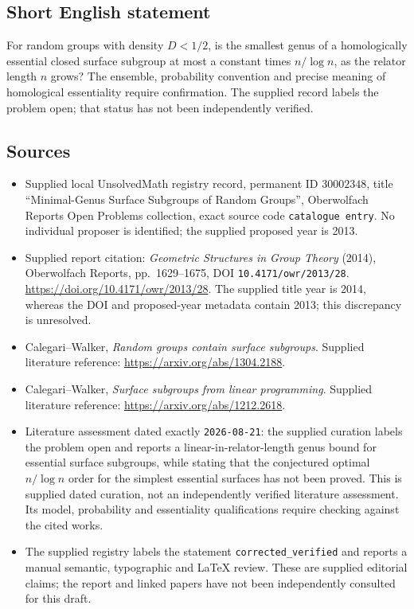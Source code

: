 \documentclass[11pt]{article}
\begin{document}
\subsection{Short English statement}
For random groups with density \(D<1/2\), is the smallest genus of a homologically essential closed surface subgroup at most a constant times \(n/\log n\), as the relator length \(n\) grows? The ensemble, probability convention and precise meaning of homological essentiality require confirmation. The supplied record labels the problem open; that status has not been independently verified.
\subsection{Sources}
\begin{itemize}
\item Supplied local UnsolvedMath registry record, permanent ID \(30002348\), title ``Minimal-Genus Surface Subgroups of Random Groups'', Oberwolfach Reports Open Problems collection, exact source code \texttt{catalogue entry}. No individual proposer is identified; the supplied proposed year is 2013.
\item Supplied report citation: \emph{Geometric Structures in Group Theory} (2014), Oberwolfach Reports, pp.\ 1629--1675, DOI \texttt{10.4171/owr/2013/28}. \url{https://doi.org/10.4171/owr/2013/28}. The supplied title year is 2014, whereas the DOI and proposed-year metadata contain 2013; this discrepancy is unresolved.
\item Calegari--Walker, \emph{Random groups contain surface subgroups}. Supplied literature reference: \url{https://arxiv.org/abs/1304.2188}.
\item Calegari--Walker, \emph{Surface subgroups from linear programming}. Supplied literature reference: \url{https://arxiv.org/abs/1212.2618}.
\item Literature assessment dated exactly \texttt{2026-08-21}: the supplied curation labels the problem open and reports a linear-in-relator-length genus bound for essential surface subgroups, while stating that the conjectured optimal \(n/\log n\) order for the simplest essential surfaces has not been proved. This is supplied dated curation, not an independently verified literature assessment. Its model, probability and essentiality qualifications require checking against the cited works.
\item The supplied registry labels the statement \texttt{corrected\_verified} and reports a manual semantic, typographic and LaTeX review. These are supplied editorial claims; the report and linked papers have not been independently consulted for this draft.
\end{itemize}
\end{document}
